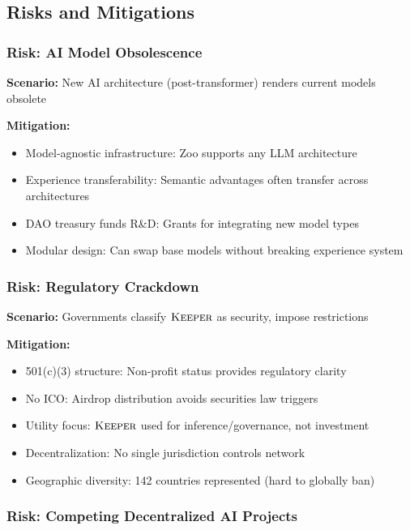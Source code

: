 \subsection{Risks and Mitigations}

\subsubsection{Risk: AI Model Obsolescence}

\textbf{Scenario:} New AI architecture (post-transformer) renders current models obsolete

\textbf{Mitigation:}
\begin{itemize}
\item Model-agnostic infrastructure: Zoo supports any LLM architecture
\item Experience transferability: Semantic advantages often transfer across architectures
\item DAO treasury funds R\&D: Grants for integrating new model types
\item Modular design: Can swap base models without breaking experience system
\end{itemize}

\subsubsection{Risk: Regulatory Crackdown}

\textbf{Scenario:} Governments classify $\textsc{Keeper}$ as security, impose restrictions

\textbf{Mitigation:}
\begin{itemize}
\item 501(c)(3) structure: Non-profit status provides regulatory clarity
\item No ICO: Airdrop distribution avoids securities law triggers
\item Utility focus: $\textsc{Keeper}$ used for inference/governance, not investment
\item Decentralization: No single jurisdiction controls network
\item Geographic diversity: 142 countries represented (hard to globally ban)
\end{itemize}

\subsubsection{Risk: Competing Decentralized AI Projects}

